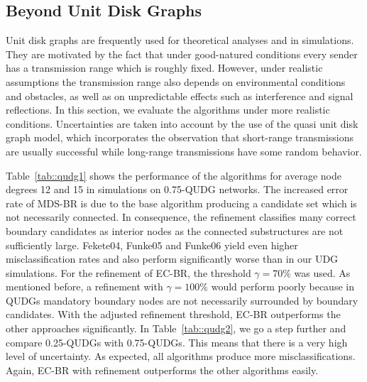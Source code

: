 \documentclass{llncs}
\begin{document}
\subsection{Beyond Unit Disk Graphs}
Unit disk graphs are frequently used for theoretical analyses and in simulations.
They are motivated by the fact that under good-natured conditions every sender has a transmission range which is roughly fixed.
However, under realistic assumptions the transmission range also depends on environmental conditions and obstacles, as well as on unpredictable effects such as interference and signal reflections.
In this section, we evaluate the algorithms under more realistic conditions.
Uncertainties are taken into account by the use of the quasi unit disk graph model, which incorporates the observation that short-range transmissions are usually successful while long-range transmissions have some random behavior.

Table~\ref{tab::qudg1} shows the performance of the algorithms for average node degrees 12 and 15 in simulations on 0.75-QUDG networks.
The increased error rate of MDS-BR is due to the base algorithm producing a candidate set which is not necessarily connected.
In consequence, the refinement classifies many correct boundary candidates as interior nodes as the connected substructures are not sufficiently large.
Fekete04, Funke05 and Funke06 yield even higher misclassification rates and also perform significantly worse than in our UDG simulations.
For the refinement of EC-BR, the threshold $\gamma=70\%$ was used.
As mentioned before, a refinement with $\gamma=100\%$ would perform poorly because in QUDGs mandatory boundary nodes are not necessarily surrounded by boundary candidates.
With the adjusted refinement threshold, EC-BR  outperforms the other approaches significantly.
In Table~\ref{tab::qudg2}, we go a step further and compare 0.25-QUDGs with 0.75-QUDGs.
This means that there is a very high level of uncertainty.
As expected, all algorithms produce more misclassifications.
Again, EC-BR with refinement outperforms the other algorithms easily.
\end{document}
